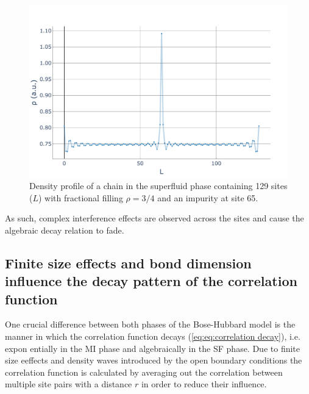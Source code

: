 \documentclass[twoside,twocolumn,9pt]{article}
\begin{document}
\begin{center}
  \begin{figure}
      \includegraphics[width=\linewidth]{../code/figures/Density-profiles-fractional-impurity.pdf}
      \caption{Density profile of a chain in the superfluid phase containing 129 sites ($L$) with fractional filling $\rho=3/4$ and an impurity at site 65.}
      \label{fig:waves-impurity}
  \end{figure}
\end{center}
As such, complex interference effects are observed across the sites and cause the algebraic decay relation to fade. 

\subsection{Finite size effects and bond dimension influence the decay pattern of the correlation function}
One crucial difference between both phases of the Bose-Hubbard model is the manner in which the correlation function decays (\cref{eq:eq:correlation decay}), i.e. expon entially in the MI phase and algebraically in the SF phase. Due to finite size eeffects and density waves introduced by the open boundary conditions the correlation function is calculated by averaging out the correlation between multiple site pairs with a distance $r$ in order to reduce their influence. 
\end{document}
